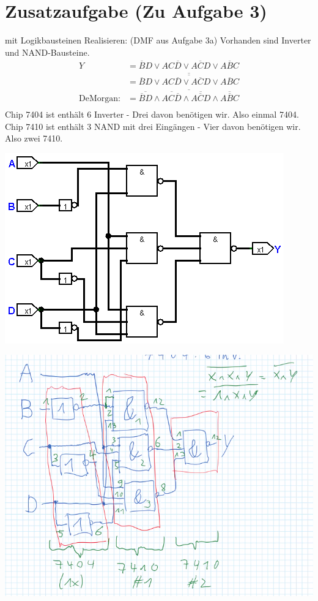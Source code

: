 \documentclass[]{article}
\newcommand{\V}{\lor}
\newcommand{\A}{\land}
\newcommand{\T}[1]{\overline{#1}}
\begin{document}
\section*{Zusatzaufgabe (Zu Aufgabe 3)}
mit Logikbausteinen Realisieren: (DMF aus Aufgabe 3a) Vorhanden sind Inverter und NAND-Bausteine.
\begin{align*}
	Y &= \T{B}D \V AC\T{D} \V A\T{C}D \V A \T{B} C \\
	 &= \T{\T{   \T{B}D \V AC\T{D} \V A\T{C}D \V A \T{B} C }} \\
	\text{DeMorgan:} &= \T{\T{   \T{B}D} \A  \T{AC\T{D}} \A \T{A\T{C}D} \A \T{A \T{B} C }} \\
\end{align*}
Chip 7404 ist enthält 6 Inverter - Drei davon benötigen wir. Also einmal 7404.\\
Chip 7410 ist enthält 3 NAND mit drei Eingängen - Vier davon benötigen wir. Also zwei 7410.\\
\begin{center}\includegraphics[scale=0.5]{Bilder/Zusatz.png}\end{center}
\begin{center}\includegraphics[scale=0.5]{Bilder/Skizze_Zusatz.png}\end{center}
\end{document}
